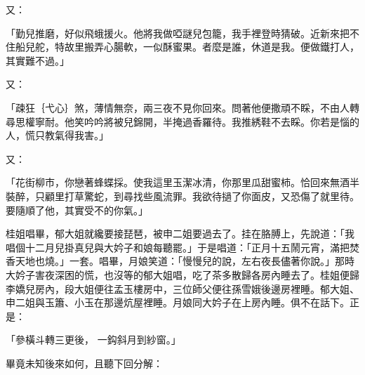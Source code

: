 \begin{showcontents}{}
又：

「勤兒推磨，好似飛蛾援火。他將我做啞謎兒包籠，我手裡登時猜破。近新來把不住船兒舵，特故里搬弄心腸軟，一似酥蜜果。者麼是誰，休道是我。便做鐵打人，其實難不過。」

又：

「疎狂｛弋心｝煞，薄情無奈，兩三夜不見你回來。問著他便撒頑不睬，不由人轉尋思權寧耐。他笑吟吟將被兒錦開，半掩過香羅待。我推綉鞋不去睬。你若是惱的人，慌只教氣得我害。」

又：

「花街柳市，你戀著蜂蝶採。使我這里玉潔冰清，你那里瓜甜蜜柿。恰回來無酒半裝醉，只顧里打草驚蛇，到尋找些風流罪。我欲待撾了你面皮，又恐傷了就里待。要隨順了他，其實受不的你氣。」

桂姐唱畢，郁大姐就纔要接琵琶，被申二姐要過去了。挂在胳膊上，先說道：「我唱個十二月兒掛真兒與大妗子和娘每聽罷。」于是唱道：「正月十五鬧元宵，滿把焚香天地也燒。」一套。唱畢，月娘笑道：「慢慢兒的說，左右夜長儘著你說。」那時大妗子害夜深困的慌，也沒等的郁大姐唱，吃了茶多散歸各房內睡去了。桂姐便歸李嬌兒房內，段大姐便往孟玉樓房中，三位師父便往孫雪娥後邊房裡睡。郁大姐、申二姐與玉簫、小玉在那邊炕屋裡睡。月娘同大妗子在上房內睡。俱不在話下。正是：

「參橫斗轉三更後，  一鈎斜月到紗窗。」

畢竟未知後來如何，且聽下回分解：






\end{showcontents}


